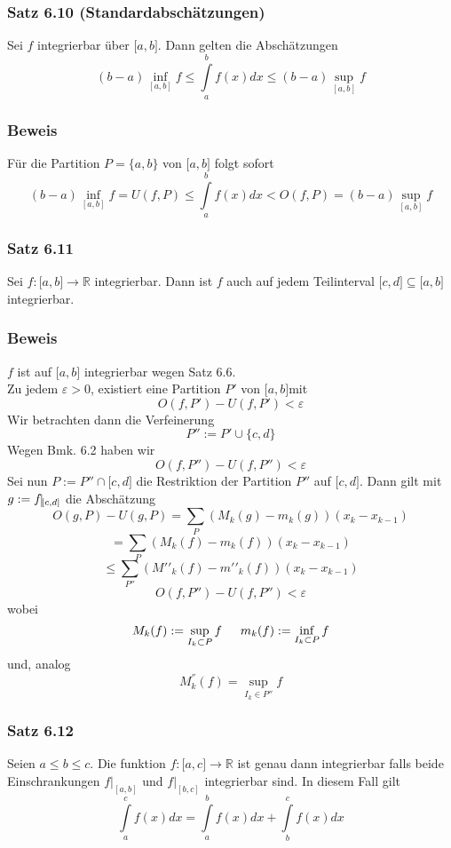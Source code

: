 \subsubsection*{Satz 6.10 (Standardabschätzungen)}
Sei $f$ integrierbar über $\lbrack a,b \rbrack$. Dann gelten die Abschätzungen \[(b - a)\mathop {\inf }\limits_{[a,b]} f \le \int\limits_a^b {f(x)dx \le (b - a)\mathop {\sup }\limits_{[a,b]} f} \] 
\subsubsection*{Beweis} 
Für die Partition $P=\{ a,b\}$ von $\lbrack a,b\rbrack$ folgt sofort \[(b - a)\mathop {\inf }\limits_{[a,b]} f = U(f,P) \le \int\limits_a^b {f(x)dx < O(f,P) = (b - a)\mathop {\sup }\limits_{[a,b]} f} \]

\subsubsection*{Satz 6.11}
Sei $f:\lbrack a,b\rbrack\rightarrow\mathbb{R}$ integrierbar. Dann ist $f$ auch auf jedem Teilinterval $\lbrack c,d\rbrack\subseteq\lbrack a,b\rbrack$ integrierbar. \\

\subsubsection*{Beweis}
$f$ ist auf $\lbrack a,b\rbrack$ integrierbar wegen Satz 6.6.\\
Zu jedem $\varepsilon>0$, existiert eine Partition $P'$ von $\lbrack a,b\rbrack$mit $$O(f,P')-U(f,P')<\varepsilon$$
Wir betrachten dann die Verfeinerung $$P'':=P'\cup\{ c,d\}$$
Wegen Bmk. 6.2 haben wir $$O(f,P'')-U(f,P'')<\varepsilon$$
Sei nun $P:=P''\cap \lbrack c,d\rbrack$ die Restriktion der Partition $P''$ auf $\lbrack c,d\rbrack$. Dann gilt mit $g:=f\vline _{\left[ c,d\right] }$ die Abschätzung
\[O(g,P) - U(g,P) = \sum\limits_P {({M_k}(g) - {m_k}(g))({x_k} - {x_{k - 1}})} \]
\[=\sum\limits_P {({M_k}(f) - {m_k}(f))({x_k} - {x_{k - 1}})} \]
\[ \le \sum\limits_{P''} {(M'{'_k}(f) - m'{'_k}(f))({x_k} - {x_{k - 1}})} \]
$$O(f,P'')-U(f,P'')<\varepsilon$$
wobei
\[{M_k}(f): = \mathop {\sup }\limits_{{I_k} \subset P} f\text{\indent}{m_k}(f): = \mathop {\inf }\limits_{{I_k} \subset P} f\]
und, analog
$$M^{''}_{k}\left( f\right) =\sup _{I_k\in P''}f$$

\subsubsection*{Satz 6.12}
Seien $a\leq b\leq c$. Die funktion $f:\lbrack a,c\rbrack\rightarrow\mathbb{R}$ ist genau dann integrierbar falls beide Einschrankungen ${\left. f \right|_{[a,b]}}$ und ${\left. f \right|_{[b,c]}}$ integrierbar sind. In diesem Fall gilt \[\int\limits_a^c {f(x)dx = \int\limits_a^b {f(x)dx + \int\limits_b^c {f(x)dx} } } \]
